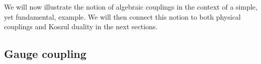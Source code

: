 \documentclass[11pt]{amsart}
\def\natalie#1{{\textcolor{green!65!black}{NMP: {#1}}}}
\begin{document}
%
%
%
%
%

We will now illustrate the notion of algebraic couplings in the context of a simple, yet fundamental, example. We will then connect this notion to both physical couplings and Koszul duality in the next sections. 

\subsection{Gauge coupling} \label{sec:gaugealg}
\end{document}
